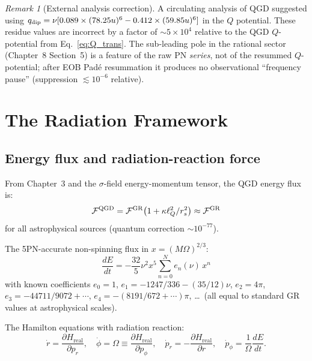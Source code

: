 \documentclass[11pt,a4paper]{article}
\theoremstyle{plain}
\theoremstyle{definition}
\theoremstyle{remark}
\newtheorem{remark}[theorem]{Remark}
\newcommand{\lQ}{\ell_Q}
\newcommand{\rs}{r_s}
\newcommand{\Hreal}{H_{\mathrm{real}}}
\begin{document}
\begin{remark}[External analysis correction]
A circulating analysis of QGD suggested using $q_{\rm dip}=\nu[0.089\times(78.25u)^6
-0.412\times(59.85u)^6]$ in the $Q$ potential.  These residue values are
incorrect by a factor of $\sim5\times10^4$ relative to the QGD $Q$-potential
from Eq.~\eqref{eq:Q_trans}.  The sub-leading pole in the rational sector
(Chapter~8 Section~5) is a feature of the raw PN \emph{series}, not of the
resummed $Q$-potential; after EOB Pad\'e resummation it produces no observational
``frequency pause'' (suppression $\lesssim10^{-6}$ relative).
\end{remark}

\section{The Radiation Framework}
\label{sec:radiation}

\subsection{Energy flux and radiation-reaction force}

From Chapter~3 and the $\sigma$-field energy-momentum tensor, the QGD energy
flux is:
\begin{equation}
  \mathcal{F}^{\rm QGD} = \mathcal{F}^{\rm GR}\!\left(1 + \kappa\lQ^2/\rs^2\right)
  \approx \mathcal{F}^{\rm GR}
  \label{eq:flux_QGD}
\end{equation}
for all astrophysical sources (quantum correction $\sim10^{-77}$).

The 5PN-accurate non-spinning flux in $x=(M\Omega)^{2/3}$:
\begin{equation}
  \frac{dE}{dt} = -\frac{32}{5}\nu^2 x^5\!\sum_{n=0}^{N}\!e_n(\nu)\,x^n
  \label{eq:flux_PN}
\end{equation}
with known coefficients $e_0=1$, $e_1=-1247/336-(35/12)\nu$, $e_2=4\pi$,
$e_3=-44711/9072+\cdots$, $e_4=-(8191/672+\cdots)\pi$, \ldots\
(all equal to standard GR values at astrophysical scales).

The Hamilton equations with radiation reaction:
\begin{equation}
  \boxed{\dot{r}=\frac{\partial\Hreal}{\partial p_r},\quad
    \dot\phi=\Omega\equiv\frac{\partial\Hreal}{\partial p_\phi},\quad
    \dot{p}_r=-\frac{\partial\Hreal}{\partial r},\quad
    \dot{p}_\phi = \frac{1}{\Omega}\frac{dE}{dt}.}
  \label{eq:EOM}
\end{equation}
\end{document}
